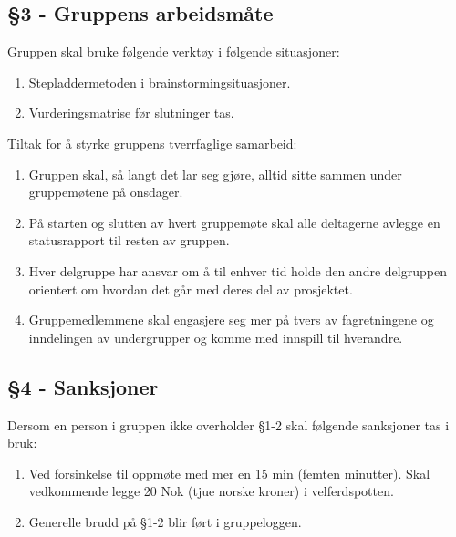 \subsection*{§3 - Gruppens arbeidsmåte}
Gruppen skal bruke følgende verktøy i følgende situasjoner:
\begin{enumerate}
\item Stepladdermetoden i brainstormingsituasjoner.
\item Vurderingsmatrise før slutninger tas.
\end{enumerate}
Tiltak for å styrke gruppens tverrfaglige samarbeid:
\begin{enumerate}
\item Gruppen skal, så langt det lar seg gjøre, alltid sitte sammen under gruppemøtene på onsdager.
\item På starten og slutten av hvert gruppemøte skal alle deltagerne avlegge en statusrapport til resten av gruppen.
\item Hver delgruppe har ansvar om å til enhver tid holde den andre delgruppen orientert om hvordan det går med deres del av prosjektet. 
\item Gruppemedlemmene skal engasjere seg mer på tvers av fagretningene og inndelingen av undergrupper og komme med innspill til hverandre. 
\end{enumerate}
\subsection*{§4 - Sanksjoner}
Dersom en person i gruppen ikke overholder §1-2 skal følgende sanksjoner tas i bruk:
\begin{enumerate}
\item Ved forsinkelse til oppmøte med mer en 15 min (femten minutter). Skal vedkommende legge 20 Nok (tjue norske kroner) i velferdspotten. 
\item Generelle brudd på §1-2 blir ført i gruppeloggen. 
\end{enumerate}